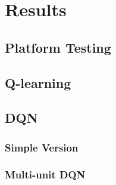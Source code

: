 
\chapter{Results}

\section{Platform Testing}

\section{Q-learning}

\section{DQN}

\subsection{Simple Version}

\subsection{Multi-unit DQN}

